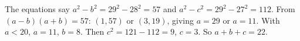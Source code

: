 The equations say $a^2-b^2=29^2-28^2=57$ and $a^2-c^2=29^2-27^2=112$. From $(a-b)(a+b)=57$: $(1,57)$ or $(3,19)$, giving $a=29$ or $a=11$. With $a<20$, $a=11$, $b=8$. Then $c^2=121-112=9$, $c=3$. So $a+b+c=\boxed{22}$.
